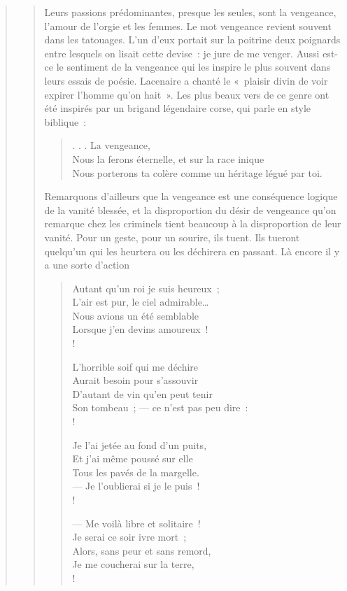 \documentclass[french,twoside]{book} %
\begin{document}
\begin{verse}
\begin{verse}
\noindent Leurs passions prédominantes, presque les seules, sont la vengeance, l’amour de l’orgie et les femmes. Le mot vengeance revient souvent dans les tatouages. L’un d’eux portait sur la poitrine deux poignards entre lesquels on lisait cette devise : je jure de me venger. Aussi est-ce le sentiment de la vengeance qui les inspire le plus souvent dans leurs essais de poésie. Lacenaire a chanté le « plaisir divin de voir expirer l’homme qu’on hait ». Les plus beaux vers de ce genre ont été inspirés par un brigand légendaire corse, qui parle en style biblique :\par


\begin{verse}
. . . La vengeance,\\
Nous la ferons éternelle, et sur la race inique\\
Nous porterons ta colère comme un héritage légué par toi.\\
\end{verse}

\noindent Remarquons d’ailleurs que la vengeance est une conséquence logique de la vanité blessée, et la disproportion du désir de vengeance qu’on remarque chez les criminels tient beaucoup à la disproportion de leur vanité. Pour un geste, pour un sourire, ils tuent. Ils tueront quelqu’un qui les heurtera ou les déchirera en passant. Là encore il y a une sorte d’action\par


\begin{verse}
Autant qu’un roi je suis heureux ;\\
L’air est pur, le ciel admirable…\\
Nous avions un été semblable\\
Lorsque j’en devins amoureux !\\!

L’horrible soif qui me déchire\\
Aurait besoin pour s’assouvir\\
D’autant de vin qu’en peut tenir\\
Son tombeau ; — ce n’est pas peu dire :\\!

Je l’ai jetée au fond d’un puits,\\
Et j’ai même poussé sur elle\\
Tous les pavés de la margelle.\\
— Je l’oublierai si je le puis !\\!

— Me voilà libre et solitaire !\\
Je serai ce soir ivre mort ;\\
Alors, sans peur et sans remord,\\
Je me coucherai sur la terre,\\!


\end{verse}
\end{verse}
\end{verse}
\end{document}
